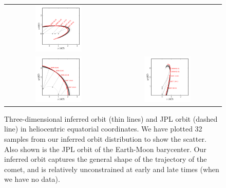 \documentclass[12pt,preprint]{aastex}
\begin{document}
\clearpage
\begin{figure}
\begin{center}
\begin{tabular}{@{}c@{}c@{}}
\includegraphics[width=0.45\textwidth]{xyzorbit-0.pdf} &
\\
\includegraphics[width=0.45\textwidth]{xyzorbit-1.pdf} &
\includegraphics[width=0.45\textwidth]{xyzorbit-2.pdf}
\end{tabular}
\end{center}
\caption{Three-dimensional inferred orbit (thin lines) and JPL orbit
  (dashed line) in heliocentric equatorial coordinates.  We have plotted
  32 samples from our inferred orbit distribution to show the scatter.
  Also shown is the JPL orbit of the Earth-Moon barycenter.  Our
  inferred orbit captures the general shape of the trajectory of the
  comet, and is relatively unconstrained at early and late times (when
  we have no data). \label{fig:three-d}}
\end{figure}
\end{document}
